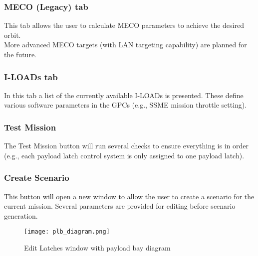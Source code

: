 \documentclass[Space_Shuttle_Vessel_Manual.tex]{subfiles}
\begin{document}
\begin{multicols*}{2}
\subsubsection{MECO (Legacy) tab}
\label{sec:meco-legacy}
This tab allows the user to calculate MECO parameters to achieve the desired orbit.\\
More advanced MECO targets (with LAN targeting capability) are planned for the future.


\subsubsection{I-LOADs tab}
In this tab a list of the currently available I-LOADs is presented. These define various software parameters in the GPCs (e.g., SSME mission throttle setting).


\subsubsection{Test Mission}
The Test Mission button will run several checks to ensure everything is in order (e.g., each payload latch control system is only assigned to one payload latch).


\subsubsection{Create Scenario}
This button will open a new window to allow the user to create a scenario for the current mission. Several parameters are provided for editing before scenario generation.


\end{multicols*}

\begin{figure}[H]
	\centering
	\captionsetup{justification=centering}
  \texttt{[image: plb\_diagram.png]}
  \caption{Edit Latches window with payload bay diagram}
  \label{fig:plb_diagram}
\end{figure}
\end{document}
